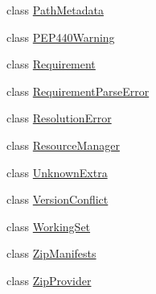 \begin{DoxyCompactItemize}
\item 
class \hyperlink{classpkg__resources_1_1_path_metadata}{Path\+Metadata}
\item 
class \hyperlink{classpkg__resources_1_1_p_e_p440_warning}{P\+E\+P440\+Warning}
\item 
class \hyperlink{classpkg__resources_1_1_requirement}{Requirement}
\item 
class \hyperlink{classpkg__resources_1_1_requirement_parse_error}{Requirement\+Parse\+Error}
\item 
class \hyperlink{classpkg__resources_1_1_resolution_error}{Resolution\+Error}
\item 
class \hyperlink{classpkg__resources_1_1_resource_manager}{Resource\+Manager}
\item 
class \hyperlink{classpkg__resources_1_1_unknown_extra}{Unknown\+Extra}
\item 
class \hyperlink{classpkg__resources_1_1_version_conflict}{Version\+Conflict}
\item 
class \hyperlink{classpkg__resources_1_1_working_set}{Working\+Set}
\item 
class \hyperlink{classpkg__resources_1_1_zip_manifests}{Zip\+Manifests}
\item 
class \hyperlink{classpkg__resources_1_1_zip_provider}{Zip\+Provider}
\end{DoxyCompactItemize}
